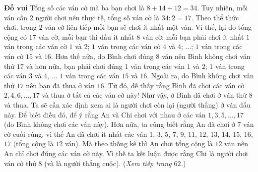 \begin{multicols}{2}
	\textbf{\color{toancuabi}Đố vui} 
	\vskip 0.05cm
	Tổng số các ván cờ mà ba bạn chơi là $8+14+12=34$. Tuy nhiên, mỗi ván cần $2$ người chơi nên thực tế, tổng số ván cờ là $34:2=17$.
	\vskip 0.05cm
	Theo thể thức chơi, trong $2$ ván cờ liên tiếp mỗi bạn sẽ chơi ít nhất một ván. Vì thế, lại do tổng cộng có $17$ ván cờ, mỗi bạn thi đấu ít nhất $8$ ván cờ: mỗi bạn phải chơi ít nhất $1$ ván trong các ván cờ $1$ và $2$; $1$ ván trong các ván cờ $4$ và $4$; ...; $1$ ván trong các ván cờ $15$ và $16$. Hơn thế nữa, do Bình chơi đúng $8$ ván nên Bình không chơi ván thứ $17$ và hơn nữa, bạn phải chơi đúng $1$ ván trong các ván $1$ và $2$; $1$ ván trong các ván $3$ và $4$, ... $1$ ván trong các ván $15$ và $16$. Ngoài ra, do Bình không chơi ván thứ $17$ nên bạn đã thua ở ván $16$. Từ đó, dễ thấy rằng Bình đã chơi các ván cờ $2, 4, 6, \ldots, 17$ và thua ở tất cả các ván cờ này!
	\vskip 0.05cm
	Như vậy, ở Bình đã chơi ở ván thứ $8$ và thua. Ta sẽ cần xác định xem ai là người chơi còn lại (người thắng) ở ván đấu này. Để biết điều đó, để ý rằng An và Chi chơi với nhau ở các ván $1, 3, 5, \ldots, 17$ (do Bình không chơi các ván này). Hơn nữa, ta cũng biết rằng An đã chơi ở $7$ ván cờ cuối cùng, vì thế An đã chơi ít nhất các ván $1$, $3$, $5$, $7$, $9$, $11$, $12$, $13$, $14$, $15$, $16$, $17$ (tổng cộng là $12$ ván). Mà theo thống kê thì An chơi tổng cộng là $12$ ván nên An chỉ chơi đúng các ván cờ này. Vì thế ta kết luận được rằng Chi là người chơi ván cờ thứ $8$ (và là người thắng cuộc).  
	\vskip 0.05cm
	\hfill (\textit{Xem tiếp trang $62$.})
\end{multicols}
\newpage
\thispagestyle{toancuabinone}
\begingroup
